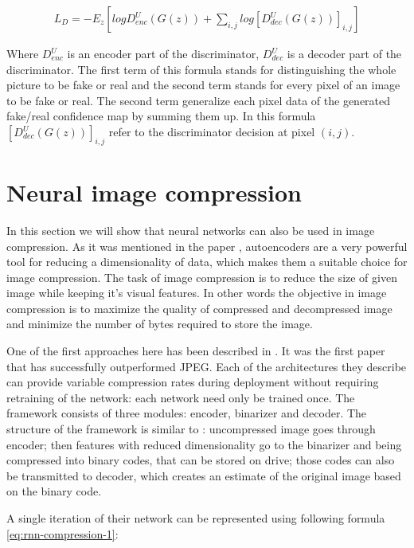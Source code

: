 \begin{equation}
    \label{eq:u-net-discriminator}
    \begin{split}
        L_D = -E_z[log D_{enc}^U(G(z)) + \sum_{i,j}{log [D_{dec}^U(G(z))]_{i,j}}]
    \end{split}
\end{equation}

Where $D_{enc}^U$ is an encoder part of the discriminator, $D_{dec}^U$ is a decoder part of the discriminator. The first term of this formula stands for distinguishing the whole picture to be fake or real and the second term stands for every pixel of an image to be fake or real. The second term generalize each pixel data of the generated fake/real confidence map by summing them up. In this formula $[D_{dec}^U(G(z))]_{i,j}$ refer to the discriminator decision at pixel $(i,j)$.

\section{Neural image compression}

In this section we will show that neural networks can also be used in image compression. As it was mentioned in the paper \cite{Autoencoder_2006}, autoencoders are a very powerful tool for reducing a dimensionality of data, which makes them a suitable choice for image compression. The task of image compression is to reduce the size of given image while keeping it's visual features. In other words the objective in image compression is to maximize the quality of compressed and decompressed image and minimize the number of bytes required to store the image.

One of the first approaches here has been described in \cite{Toderici_Vincent_Johnston_Hwang_Minnen_Shor_Covell_2017}. It was the first paper that has successfully outperformed JPEG. Each of the architectures they describe can provide variable compression rates during deployment without requiring retraining of the network: each network need only be trained once. The framework consists of three modules: encoder, binarizer and decoder. The structure of the framework is similar to \cite{Autoencoder_2006}: uncompressed image goes through encoder; then features with reduced dimensionality go to the binarizer and being compressed into binary codes, that can be stored on drive; those codes can also be transmitted to decoder, which creates an estimate of the original image based on the binary code.

A single iteration of their network can be represented using following formula \ref{eq:rnn-compression-1}:

